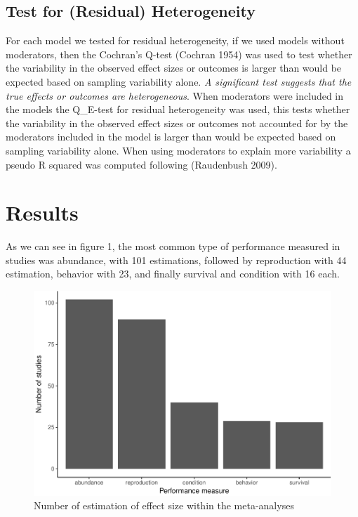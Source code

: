 \documentclass[]{elsarticle} %
\makeatletter
\def\maxwidth{\ifdim\Gin@nat@width>\linewidth\linewidth
\else\Gin@nat@width\fi}
\let\Oldincludegraphics\includegraphics
\renewcommand{\includegraphics}[1]{\Oldincludegraphics[width=\maxwidth]{#1}}
\makeatother
\begin{document}
\subsection{Test for (Residual)
Heterogeneity}\label{test-for-residual-heterogeneity}

For each model we tested for residual heterogeneity, if we used models
without moderators, then the Cochran's Q-test (Cochran 1954) was used to
test whether the variability in the observed effect sizes or outcomes is
larger than would be expected based on sampling variability alone.
\emph{A significant test suggests that the true effects or outcomes are
heterogeneous}. When moderators were included in the models the
Q\_E-test for residual heterogeneity was used, this tests whether the
variability in the observed effect sizes or outcomes not accounted for
by the moderators included in the model is larger than would be expected
based on sampling variability alone. When using moderators to explain
more variability a pseudo R squared was computed following (Raudenbush
2009).

\section{Results}\label{results}

As we can see in figure 1, the most common type of performance measured
in studies was abundance, with 101 estimations, followed by reproduction
with 44 estimation, behavior with 23, and finally survival and condition
with 16 each.

\begin{figure}[htbp]
\centering
\includegraphics{MetanalysisNeonics2_files/figure-latex/unnamed-chunk-2-1.pdf}
\caption{Number of estimation of effect size within the meta-analyses}
\end{figure}
\end{document}
